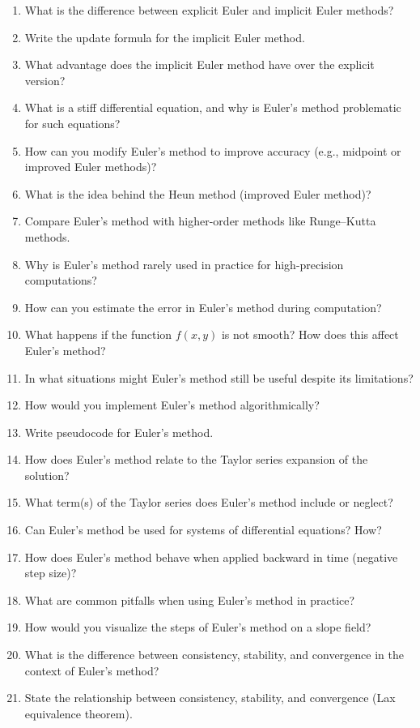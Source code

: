 \begin{enumerate}
  \item What is the difference between explicit Euler and implicit Euler methods?
  \item Write the update formula for the implicit Euler method.
  \item What advantage does the implicit Euler method have over the explicit version?
  \item What is a stiff differential equation, and why is Euler's method problematic for such equations?
  \item How can you modify Euler's method to improve accuracy (e.g., midpoint or improved Euler methods)?
  \item What is the idea behind the Heun method (improved Euler method)?
  \item Compare Euler's method with higher-order methods like Runge--Kutta methods.
  \item Why is Euler's method rarely used in practice for high-precision computations?
  \item How can you estimate the error in Euler's method during computation?
  \item What happens if the function $f(x,y)$ is not smooth? How does this affect Euler's method?
  \item In what situations might Euler's method still be useful despite its limitations?
  \item How would you implement Euler's method algorithmically?
  \item Write pseudocode for Euler's method.
  \item How does Euler's method relate to the Taylor series expansion of the solution?
  \item What term(s) of the Taylor series does Euler's method include or neglect?
  \item Can Euler's method be used for systems of differential equations? How?
  \item How does Euler's method behave when applied backward in time (negative step size)?
  \item What are common pitfalls when using Euler's method in practice?
  \item How would you visualize the steps of Euler's method on a slope field?
  \item What is the difference between consistency, stability, and convergence in the context of Euler's method?
  \item State the relationship between consistency, stability, and convergence (Lax equivalence theorem).
\end{enumerate}
